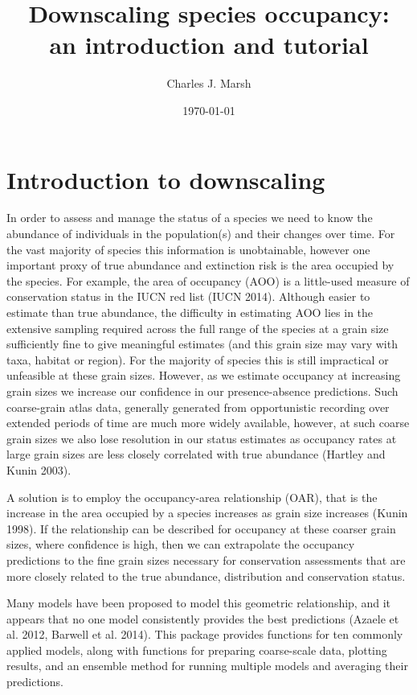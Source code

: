 \documentclass{article}[12pt, a4paper]
\begin{document}


\title{Downscaling species occupancy: \\ an introduction and tutorial}
\author{Charles J. Marsh}
\date{\today}
\maketitle

\section{Introduction to downscaling}

In order to assess and manage the status of a species we need to know the abundance of individuals in the population(s) and their changes over time. For the vast majority of species this information is unobtainable, however one important proxy of true abundance and extinction risk is the area occupied by the species. For example, the area of occupancy (AOO) is a little-used measure of conservation status in the IUCN red list (IUCN 2014). Although easier to estimate than true abundance, the difficulty in estimating AOO lies in the extensive sampling required across the full range of the species at a grain size sufficiently fine to give meaningful estimates (and this grain size may vary with taxa, habitat or region). For the majority of species this is still impractical or unfeasible at these grain sizes. However, as we estimate occupancy at increasing grain sizes we increase our confidence in our presence-absence predictions. Such coarse-grain atlas data, generally generated from opportunistic recording over extended periods of time are much more widely available, however, at such coarse grain sizes we also lose resolution in our status estimates as occupancy rates at large grain sizes are less closely correlated with true abundance (Hartley and Kunin 2003).

A solution is to employ the occupancy-area relationship (OAR), that is the increase in the  area occupied by a species increases as grain size increases (Kunin 1998). If the relationship can be described for occupancy at these coarser grain sizes, where confidence is high, then we can extrapolate the occupancy predictions to the fine grain sizes necessary for conservation assessments that are more closely related to the true abundance, distribution and conservation status.

Many models have been proposed to model this geometric relationship, and it appears that no one model consistently provides the best predictions (Azaele et al. 2012, Barwell et al. 2014). This package provides functions for ten commonly applied models, along with functions for preparing coarse-scale data, plotting results, and an ensemble method for running multiple models and averaging their predictions.
\end{document}
